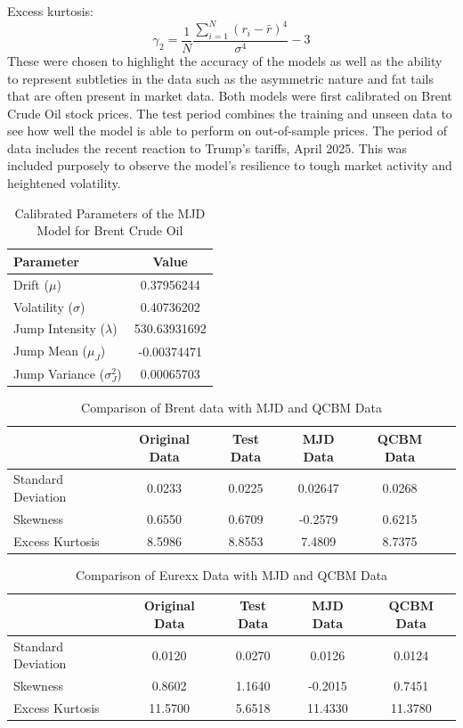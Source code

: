 \documentclass[12pt]{article}
\numberwithin{equation}{section}
\begin{document}
Excess kurtosis:
$$
\gamma_2 = \frac{1}{N}\frac{\sum_{i=1}^{N} (r_i - \bar{r})^4}{\sigma^4} - 3
$$
These 
were chosen to highlight the accuracy of the models as well as the ability to represent 
subtleties in the data such as the asymmetric nature and fat tails that are often 
present in market data. Both models were first calibrated on Brent Crude Oil stock 
prices. The test period combines the training and unseen data to see how well the 
model is able to perform on out-of-sample prices. The period of data includes the 
recent reaction to Trump's tariffs, April 2025. This was included purposely to observe 
the model's resilience to tough market activity and heightened volatility.
\begin{table}[h!]
\centering
\begin{tabular}{|l|c|}
\hline
\textbf{Parameter} & \textbf{Value} \\
\hline
Drift ($\mu$) & 0.37956244 \\
Volatility ($\sigma$) & 0.40736202 \\
Jump Intensity ($\lambda$) & 530.63931692 \\
Jump Mean ($\mu_J$) & -0.00374471 \\
Jump Variance ($\sigma_J^2$) & 0.00065703 \\
\hline
\end{tabular}
\caption{Calibrated Parameters of the MJD Model for Brent Crude Oil}
\label{tab:mjd_params}
\end{table}

\begin{table}[h!]
\centering
\begin{tabular}{lccccc}
\hline
\textbf{} & \textbf{Original Data} & \textbf{Test Data} & \textbf{MJD Data} & \textbf{QCBM Data} \\
\hline 
Standard Deviation & 0.0233 &0.0225 & 0.02647 & 0.0268   \\
Skewness            & 0.6550 &0.6709 & -0.2579 & 0.6215 \\
Excess Kurtosis     & 8.5986 &8.8553 & 7.4809 & 8.7375  \\
\hline
\end{tabular}
\caption{Comparison of Brent data with MJD and QCBM Data}
\label{tab:brentdata}
\end{table}


\begin{table}[h!]
\centering
\begin{tabular}{lcccc}
\hline
\textbf{} & \textbf{Original Data} & \textbf{Test Data} & \textbf{MJD Data} & \textbf{QCBM Data} \\
\hline 
Standard Deviation  & 0.0120  & 0.0270  & 0.0126  & 0.0124 \\
Skewness            & 0.8602  & 1.1640  & -0.2015 & 0.7451 \\
Excess Kurtosis     & 11.5700 & 5.6518  & 11.4330 & 11.3780 \\
\hline
\end{tabular}
\caption{Comparison of Eurexx Data with MJD and QCBM Data}
\label{tab:eurexxdata}
\end{table}
\end{document}
